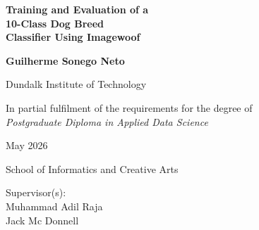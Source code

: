 \documentclass[12pt, a4paper]{article}
\begin{document}

\begin{titlepage}
  \centering
  \vspace*{2cm}

  {\LARGE\bfseries Training and Evaluation of a \\10-Class Dog Breed\\
  Classifier Using Imagewoof\par}

  \vspace{2cm}

  {\large\textbf{Guilherme Sonego Neto}\par}

  \vspace{1cm}

  {\large Dundalk Institute of Technology\par}

  \vspace{1.5cm}

  {\normalsize
    In partial fulfilment of the requirements for the degree of\\[0.3em]
    \textit{Postgraduate Diploma in Applied Data Science}\par}

  \vspace{1.5cm}

  {\large May 2026\par}

  \vspace{1.5cm}

  {\normalsize School of Informatics and Creative Arts\par}

  \vspace{0.5cm}

  {\normalsize
    Supervisor(s):\\[0.3em]
    Muhammad Adil Raja\\
    Jack Mc Donnell\par}

  \vfill
\end{titlepage}
\end{document}
